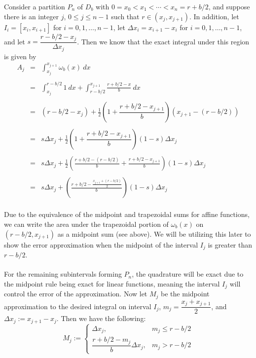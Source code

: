 \documentclass{article}
\begin{document}
Consider a partition $P_n$ of $D_b$ with $0 = x_0 < x_1 < \cdots < x_n = r + b/2$, and suppose there is an integer $j$, $0 \leq j \leq n - 1$ such that $r \in (x_j, x_{j+1})$. In addition, let $I_i = [x_i, x_{i+1}]$ for $i = 0, 1, \ldots, n-1$, let $\Delta x_i = x_{i+1} - x_i$ for $i = 0, 1, \ldots, n-1$, and let $s = \dfrac{r - b/2 - x_j}{\Delta x_j}$. Then we know that the exact integral under this region is given by
\[
    \begin{array}{rcl}
    A_j &=& \displaystyle
            \int_{x_j}^{x_{j+1}} \omega_b(x) \: dx \\
        & &	\\
        &=& \displaystyle
            \int_{x_j}^{r-b/2} 1 \: dx +
            \int_{r-b/2}^{x_{j+1}} \frac{r+b/2-x}{b} \: dx \\
        & &	\\
        &=& \displaystyle
            (r - b/2 - x_j) +
            \frac{1}{2}
            \left( 1 + \dfrac{r + b/2 - x_{j+1}}{b} \right)
            (x_{j+1} - (r - b/2)) \\
        & &	\\
        &=& \displaystyle
            s\Delta x_j +
            \frac{1}{2}
            \left( 1 + \dfrac{r + b/2 - x_{j+1}}{b} \right)
            (1 - s) \Delta x_j \\
        & &	\\
        &=& \displaystyle
            s\Delta x_j +
            \frac{1}{2}
            \left(
                \frac{r + b/2 - (r - b/2)}{b} +
                \frac{r + b/2 - x_{j+1}}{b}
            \right)
            (1 - s) \Delta x_j \\
        & &	\\
        &=& \displaystyle
            s\Delta x_j +
            \left(
                \frac{
                    r + b/2 -
                    \frac{x_{j+1} + (r - b/2)}{2}
                }{b}
            \right)
            (1 - s) \Delta x_j \\
    \end{array}
\]

\noindent
Due to the equivalence of the midpoint and trapezoidal sums for affine functions, we can write the area under the trapezoidal portion of $\omega_b(x)$ on $(r - b/2, x_{j+1})$ as a midpoint sum (see above). We will be utilizing this later to show the error approximation when the midpoint of the interval $I_j$ is greater than $r - b/2$.
\\
\\
For the remaining subintervals forming $P_n$, the quadrature will be exact due to the midpoint rule being exact for linear functions, meaning the interval $I_j$ will control the error of the approximation. Now let $M_j$ be the midpoint approximation to the desired integral on interval $I_j$, $m_j = \dfrac{x_j + x_{j+1}}{2}$, and $\Delta x_j := x_{j+1} - x_j$. Then we have the following:
\[
    M_j := 
    \begin{cases}
        \Delta x_j, & m_j \leq r - b/2 \\
        \dfrac{r + b/2 - m_j}{b} \Delta x_j, & m_j > r - b/2
    \end{cases}
\]
\end{document}
